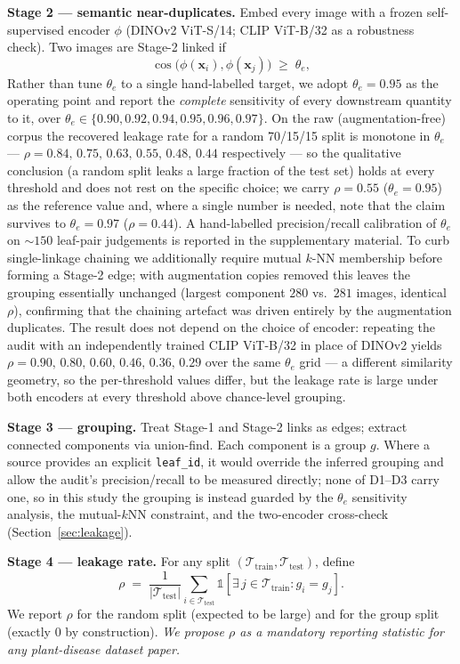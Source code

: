 \documentclass[10pt,twocolumn,a4paper]{article}
\newcommand{\x}{\mathbf{x}}
\begin{document}
\textbf{Stage 2 --- semantic near-duplicates.} Embed every image with a frozen self-supervised encoder $\phi$ (DINOv2 ViT-S/14; CLIP ViT-B/32 as a robustness check). Two images are Stage-2 linked if
\begin{equation}
\cos\!\big(\phi(\x_i),\phi(\x_j)\big) \;\ge\; \theta_e ,
\end{equation}
Rather than tune $\theta_e$ to a single hand-labelled target, we adopt $\theta_e=0.95$ as the operating point and report the \emph{complete} sensitivity of every downstream quantity to it, over $\theta_e \in \{0.90,0.92,0.94,0.95,0.96,0.97\}$. On the raw (augmentation-free) corpus the recovered leakage rate for a random 70/15/15 split is monotone in $\theta_e$ --- $\rho = 0.84,\,0.75,\,0.63,\,0.55,\,0.48,\,0.44$ respectively --- so the qualitative conclusion (a random split leaks a large fraction of the test set) holds at every threshold and does not rest on the specific choice; we carry $\rho=0.55$ ($\theta_e=0.95$) as the reference value and, where a single number is needed, note that the claim survives to $\theta_e=0.97$ ($\rho=0.44$). A hand-labelled precision/recall calibration of $\theta_e$ on $\sim150$ leaf-pair judgements is reported in the supplementary material. To curb single-linkage chaining we additionally require mutual $k$-NN membership before forming a Stage-2 edge; with augmentation copies removed this leaves the grouping essentially unchanged (largest component $280$ vs.\ $281$ images, identical $\rho$), confirming that the chaining artefact was driven entirely by the augmentation duplicates. The result does not depend on the choice of encoder: repeating the audit with an independently trained CLIP ViT-B/32 in place of DINOv2 yields $\rho = 0.90,\,0.80,\,0.60,\,0.46,\,0.36,\,0.29$ over the same $\theta_e$ grid --- a different similarity geometry, so the per-threshold values differ, but the leakage rate is large under both encoders at every threshold above chance-level grouping.

\textbf{Stage 3 --- grouping.} Treat Stage-1 and Stage-2 links as edges; extract connected components via union-find. Each component is a group $g$. Where a source provides an explicit \texttt{leaf\_id}, it would override the inferred grouping and allow the audit's precision/recall to be measured directly; none of D1--D3 carry one, so in this study the grouping is instead guarded by the $\theta_e$ sensitivity analysis, the mutual-$k$NN constraint, and the two-encoder cross-check (Section~\ref{sec:leakage}).

\textbf{Stage 4 --- leakage rate.} For any split $(\mathcal{T}_{\text{train}},\mathcal{T}_{\text{test}})$, define
\begin{equation}
\rho \;=\; \frac{1}{|\mathcal{T}_{\text{test}}|}\sum_{i \in \mathcal{T}_{\text{test}}} \mathbb{1}\!\left[\exists\, j \in \mathcal{T}_{\text{train}} : g_i = g_j\right].
\end{equation}
We report $\rho$ for the random split (expected to be large) and for the group split (exactly $0$ by construction). \emph{We propose $\rho$ as a mandatory reporting statistic for any plant-disease dataset paper.}
\end{document}
